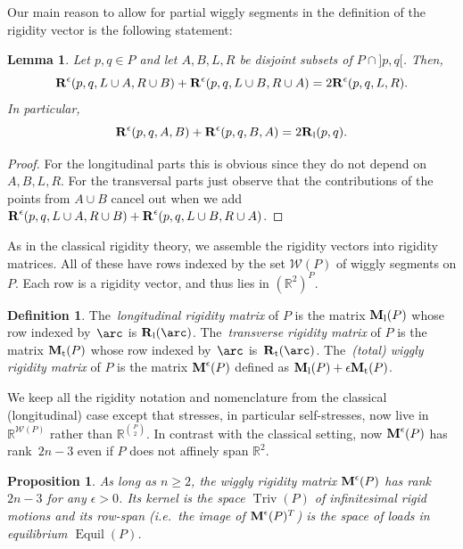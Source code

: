 \documentclass{amsart}
\newtheorem{proposition}[theorem]{Proposition}
\newtheorem{lemma}[theorem]{Lemma}
\theoremstyle{definition}
\newtheorem{definition}[theorem]{Definition}
\newcommand{\R}{\mathbb{R}} %
\renewcommand{\b}[1]{{\boldsymbol{#1}}} %
\newcommand{\ie}{\textit{i.e.}~} %
\newcommand{\darkblue}{\color{darkblue}} %
\newcommand{\defn}[1]{\textsl{\darkblue #1}} %
\newcommand{\wigglySegments}{\mathcal{W}} %
\newcommand{\Rvector}{\b{\rm R}} %
\newcommand{\lon}{\operatorname{l}} %
\newcommand{\trans}{\operatorname{t}} %
\newcommand{\Rlong}{\Rvector_{\lon}} %
\newcommand{\Rtrans}{\Rvector_{\trans}} %
\newcommand{\Reps}{\Rvector^\epsilon} %
\newcommand{\Mmatrix}{\b{\rm M}} %
\newcommand{\Mlong}{\Mmatrix_{\lon}} %
\newcommand{\Mtrans}{\Mmatrix_{\trans}} %
\newcommand{\Meps}{\Mmatrix^\epsilon} %
\newcommand{\Equil}{\operatorname{Equil} } %
\newcommand{\Triv}{\operatorname{Triv} } %
\begin{document}
Our main reason to allow for partial wiggly segments in the definition of the rigidity vector is the following statement:

\begin{lemma}
\label{lema:partial_rigidity}
Let $p,q\in P$ and let $A,B,L,R$ be disjoint subsets of $P \cap {]p,q[}$. Then,
\[
\Reps(p,q,L \cup A,R\cup B) + \Reps(p,q,L \cup B,R\cup A) = 2 \Reps(p,q, L,R).
\]
In particular,
\[
\Reps(p,q,  A , B) + \Reps(p,q,  B,  A) = 2 \Rlong(p,q).
\]
\end{lemma}

\begin{proof}
For the longitudinal parts this is obvious since they do not depend on $A,B,L,R$. For the transversal parts just observe that the contributions of the points from $A\cup B$ cancel out when we add $\Reps(p,q,L \cup A,R\cup B) + \Reps(p,q,L \cup B,R\cup A)$.
\end{proof}


As in the classical rigidity theory, we assemble the rigidity vectors into rigidity matrices.
All of these have rows indexed by the set $\wigglySegments(P)$ of wiggly segments on \(P\).
Each row is a rigidity vector, and thus lies in \((\R^2)^P\).

\begin{definition}\label{def:rm}
The~\defn{longitudinal rigidity matrix} of \(P\) is the matrix \(\Mlong(P)\) whose row indexed by~\(\arc\) is \(\Rlong(\arc)\).
The~\defn{transverse rigidity matrix} of \(P\) is the matrix \(\Mtrans(P)\) whose row indexed by~\(\arc\) is~\(\Rtrans(\arc)\).
The~\defn{(total) wiggly rigidity matrix} of \(P\) is the matrix \(\Meps(P)\) defined as \(\Mlong(P) + \epsilon \Mtrans(P)\).
\end{definition}

We keep all the rigidity notation and nomenclature from the classical (longitudinal) case except that stresses, in particular self-stresses, now live in $\R^{\wigglySegments(P)}$ rather than $\R^{\binom{P}{2}}$.
In contrast with the classical setting, now \(\Meps(P)\) has rank~\(2n - 3\) even if $P$ does not affinely span $\R^2$.

\begin{proposition}
\label{prop:kernel}
As long as $n\ge 2$, the wiggly rigidity matrix $\Meps(P)$ has rank~\(2n - 3\) for any \(\epsilon > 0\).
Its kernel is the space $\Triv(P)$ of infinitesimal rigid motions and its row-span (\ie the image of \(\Meps(P)^T\)) is the space of loads in equilibrium $\Equil(P)$.
\end{proposition}
\end{document}
